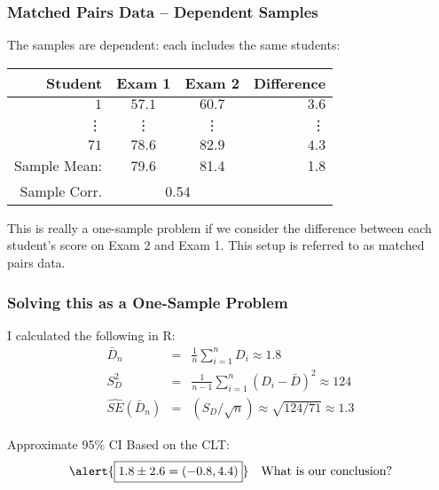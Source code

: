 \begin{frame}
  \frametitle{Matched Pairs Data -- Dependent Samples}
The samples are dependent: each includes \alert{the same students}:
%
\begin{table}[!tbp]
\begin{center}
\begin{tabular}{rccr}
\hline\hline
\multicolumn{1}{r}{Student}&\multicolumn{1}{c}{Exam 1}&\multicolumn{1}{c}{Exam 2}&\multicolumn{1}{r}{Difference}\tabularnewline
\hline
$ 1$&$57.1$&$60.7$&$  3.6$\tabularnewline
\vdots&\vdots&\vdots&\vdots\\
$71$&$78.6$&$82.9$&$  4.3$\tabularnewline
\hline
Sample Mean: & 79.6 & 81.4  &1.8\\
\alert{Sample Corr.} & \multicolumn{2}{c}{\alert{0.54}}&\\
\hline
\end{tabular}
\end{center}
\end{table}

This is really a \alert{one-sample} problem if we consider the \alert{difference} between each student's score on Exam 2 and Exam 1.
This setup is referred to as \alert{matched pairs data}.

\end{frame}
\begin{frame}
\frametitle{Solving this as a One-Sample Problem}
\small
{}

\vspace{2em}
I calculated the following in R:
	\begin{eqnarray*}
	\bar{D}_n &=& \frac{1}{n}\sum_{i=1}^n D_i \approx 1 .8\\
	S^2_D &=& \frac{1}{n-1}\sum_{i=1}^n (D_i - \bar{D})^2 \approx 	124\\ 
	\widehat{SE}(\bar{D}_n) &=&(S_D /\sqrt{n}) \approx \sqrt{124/71} \approx 1.3 
	\end{eqnarray*}
	
\vspace{1em}
\alert{Approximate 95\% CI Based on the CLT:}
$$\alert{\boxed{1.8 \pm 2.6 = (-0.8, 4.4)}} \quad \mbox{What is our conclusion?}$$

\end{frame}

